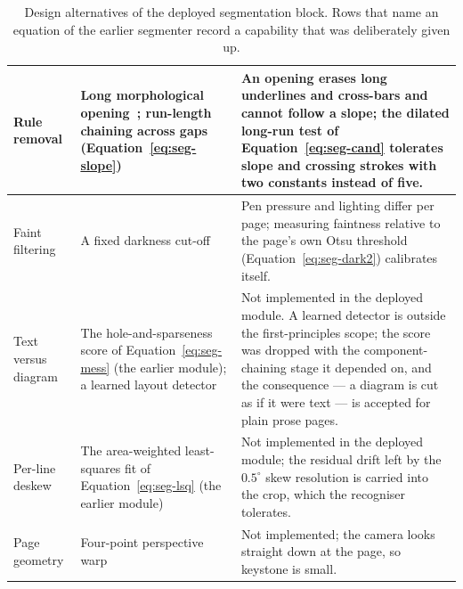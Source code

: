 \begin{table}[h]
\begin{tabularx}{\linewidth}{|p{2.6cm}|X|X|}
\hline
Rule removal & Long morphological opening~\cite{haralick1987}; run-length chaining across gaps (Equation~\ref{eq:seg-slope}) & An opening erases long underlines and cross-bars and cannot follow a slope; the dilated long-run test of Equation~\ref{eq:seg-cand} tolerates slope and crossing strokes with two constants instead of five. \\
\hline
Faint filtering & A fixed darkness cut-off & Pen pressure and lighting differ per page; measuring faintness relative to the page's own Otsu threshold (Equation~\ref{eq:seg-dark2}) calibrates itself. \\
\hline
Text versus diagram & The hole-and-sparseness score of Equation~\ref{eq:seg-mess} (the earlier module); a learned layout detector & Not implemented in the deployed module. A learned detector is outside the first-principles scope; the score was dropped with the component-chaining stage it depended on, and the consequence --- a diagram is cut as if it were text --- is accepted for plain prose pages. \\
\hline
Per-line deskew & The area-weighted least-squares fit of Equation~\ref{eq:seg-lsq} (the earlier module) & Not implemented in the deployed module; the residual drift left by the $0.5^\circ$ skew resolution is carried into the crop, which the recogniser tolerates. \\
\hline
Page geometry & Four-point perspective warp & Not implemented; the camera looks straight down at the page, so keystone is small. \\
\hline
\end{tabularx}
\caption{Design alternatives of the deployed segmentation block. Rows that name an equation of the earlier segmenter record a capability that was deliberately given up.}
\label{tab:seg-alt}
\end{table}

